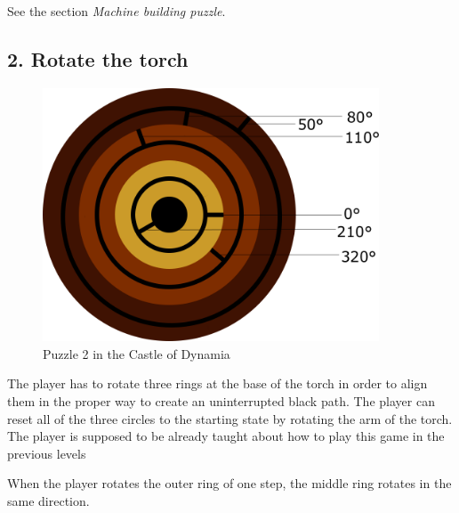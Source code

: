 
%

%

See the section \textit{Machine building puzzle}.


\subsection{2. Rotate the torch}

\begin{figure}[H]
  \centering
  \includegraphics[width=10cm]{Images/Puzzles/castleOfDynamia2}
  \caption{Puzzle 2 in the Castle of Dynamia}
\end{figure}

The player has to rotate three rings at the base of the torch in order to align them in the proper way to create an uninterrupted black path. The player can reset all of the three circles to the starting state by rotating the arm of the torch. The player is supposed to be already taught about how to play this game in the previous levels

When the player rotates the outer ring of one step, the middle ring rotates in the same direction.

